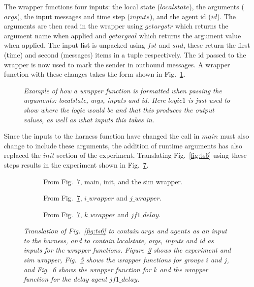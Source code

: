 \documentclass{article}
\begin{document}
The wrapper functions four inputs: the local state ($localstate$), the arguments ($args$), the input messages and time step ($inputs$), and the agent id ($id$). The arguments are then read in the wrapper using $getargstr$ which returns the argument name when applied and $getargval$ which returns the argument value when applied. The input list is unpacked using $fst$ and $snd$, these return the first (time) and second (messages) items in a tuple respectively. The id passed to the wrapper is now used to mark the sender in outbound messages. A wrapper function with these changes takes the form shown in Fig.~\ref{fig:wrap7}. 
\begin{figure}[H]
	\centering
	
	\caption{\it Example of how a wrapper function is formatted when passing the arguments: localstate, args, inputs and id. Here $logic1$ is just used to show where the logic would be and that this produces the output values, as well as what inputs this takes in.}
	\label{fig:wrap7}
\end{figure} 

Since the inputs to the harness function have changed the call in $main$ must also change to include these arguments, the addition of runtime arguments has also replaced the $init$ section of the experiment. Translating Fig.~\ref{fig:ts6} using these steps results in the experiment shown in Fig.~\ref{fig:ts7}.
\begin{figure}[H]
	\centering
	\begin{subfigure}[b]{1\textwidth}
	
	\caption{From Fig.~\ref{fig:ts7}, main, init, and the sim wrapper.}
        \label{fig:ts71}
	\end{subfigure}
	\caption*{}
\end{figure}
	
\begin{figure}[H]\ContinuedFloat
	\centering
	\begin{subfigure}[b]{1\textwidth}
	
	\caption{From Fig.~\ref{fig:ts7}, $i\_wrapper$ and $j\_wrapper$.}
        \label{fig:ts72}
	\end{subfigure}
	\caption*{}
\end{figure}
	
\begin{figure}[H]\ContinuedFloat
	\centering
	\begin{subfigure}[b]{1\textwidth}
	
	\caption{From Fig.~\ref{fig:ts7}, $k\_wrapper$ and $jf1\_delay$.}
        \label{fig:ts73}
	\end{subfigure}
	\caption{\it Translation of Fig.~\ref{fig:ts6} to contain $args$ and $agents$ as an input to the harness, and to contain localstate, args, inputs and id as inputs for the wrapper functions. Figure~\ref{fig:ts71} shows the experiment and sim wrapper, Fig.~\ref{fig:ts72} shows the wrapper functions for groups $i$ and $j$, and Fig.~\ref{fig:ts73} shows the wrapper function for $k$ and the wrapper function for the delay agent $jf1\_delay$.}
	\label{fig:ts7}
\end{figure} 
\end{document}
